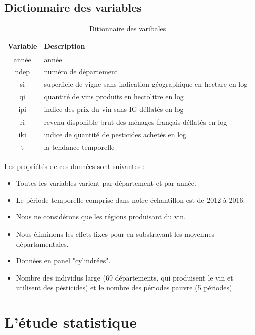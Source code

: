 \documentclass[11pt,]{article}
\begin{document}
\FloatBarrier

\hypertarget{dictionnaire-des-variables}{%
\subsection{Dictionnaire des
variables}\label{dictionnaire-des-variables}}

\FloatBarrier
\begin{table}[!htbp]
  \centering
\caption{Ditionnaire des varibales}
\begin{tabular}{c|l}
  \hline
  Variable & Description \\
  \hline
année & année \\
ndep & numéro de département \\
si & superficie de vigne sans indication géographique en hectare en log \\
qi & quantité de vins produits en hectolitre en log \\
ipi & indice des prix du vin sans IG déflatés en log  \\
ri & revenu disponible brut des ménages français déflatés en log \\
iki & indice de quantité de pesticides achetés en log \\
t & la tendance temporelle \\
\hline
\end{tabular}
\end{table}

\FloatBarrier

Les propriétés de ces données sont suivantes :

\begin{itemize}
  \item Toutes les variables varient par département et par année.
  \item Le période temporelle comprise dans notre échantillon est de 2012 à 2016.
  \item Nous ne considérons que les régions produisant du vin. 
  \item Nous éliminons les effets fixes pour en substrayant les moyennes départamentales.
  \item Données en panel "cylindrées".
  \item Nombre des individus large (69 départements, qui produisent le vin et utilisent des pésticides) et le nombre des périodes pauvre (5 périodes).
\end{itemize}

\FloatBarrier

\hypertarget{letude-statistique}{%
\section{L'étude statistique}\label{letude-statistique}}
\end{document}
